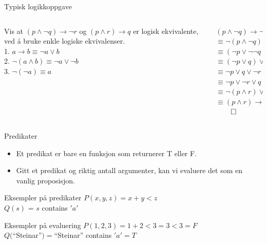 \begin{frame}{Typisk logikkoppgave}
    \begin{columns}
    \begin{column}{0.48\textwidth}
        Vis at $(p \land \lnot q) \rightarrow \lnot r$ og $(p \land r) \rightarrow q$ er logisk ekvivalente, ved å bruke enkle logiske ekvivalenser.\\[1cm]
        1. $a \rightarrow b \equiv \lnot a \lor b$ \\
        2. $\lnot (a \land b) \equiv \lnot a \lor \lnot b$\\
        3. $\lnot (\lnot a) \equiv a$
    \end{column}
    \begin{column}{0.48\textwidth}
            \pause
            $(p \land \lnot q) \rightarrow \lnot r$ \\
            \pause
            $\equiv \lnot (p \land \lnot q) \lor \lnot r$ \\
            \pause
            $\equiv (\lnot p \lor \lnot \lnot q) \lor \lnot r$ \\
            \pause
            $\equiv (\lnot p \lor q) \lor \lnot r$ \\
            \pause
            $\equiv \lnot p \lor q \lor \lnot r$ \\
            \pause
            $\equiv \lnot p \lor \lnot r \lor q$ \\
            \pause
            $\equiv \lnot (p \land r) \lor q$ \\
            \pause
            $\equiv (p \land r) \rightarrow q$
            $\qed$
    \end{column}
    \end{columns}
\end{frame}

\begin{frame}{Predikater}
    \begin{itemize}
        \item Et predikat er bare en funksjon som returnerer T eller F.
        \item Gitt et predikat og riktig antall argumenter, kan vi evaluere det som en vanlig proposisjon.
    \end{itemize}
    \begin{block}{Eksempler på predikater}
        $P(x, y, z) = x + y < z$\\
        $Q(s)$ = $s$ contains $'a'$
    \end{block}
    \pause
    \begin{block}{Eksempler på evaluering}
        $P(1, 2, 3) = 1 + 2 < 3 = 3 < 3 = F$ \\ 
        $Q($\enquote{Steinar}$) = $\enquote{Steinar} contains $'a' = T$
    \end{block}

\end{frame}


